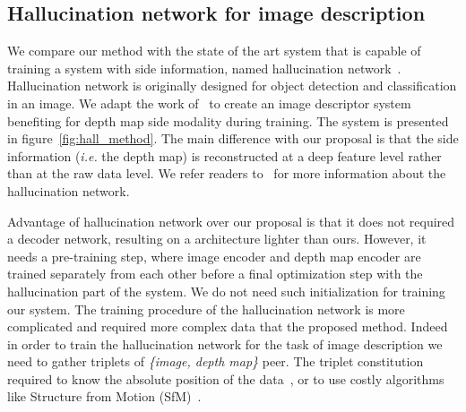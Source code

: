 %

%

\subsection{Hallucination network for image description}
\label{subsec:hall}
We compare our method with the state of the art system that is capable of training a system with side information, named hallucination network~\cite{Hoffman2016}. Hallucination network is originally designed for object detection and classification in an image. We adapt the work of~\cite{Hoffman2016} to create an image descriptor system benefiting for depth map side modality during training. The system is presented in figure~\ref{fig:hall_method}. The main difference with our proposal is that the side information (\textit{i.e.} the depth map) is reconstructed at a deep feature level rather than at the raw data level. We refer readers to~\cite{Hoffman2016} for more information about the hallucination network.

Advantage of hallucination network over our proposal is that it does not required a decoder network, resulting on a architecture lighter than ours. However, it needs a pre-training step, where image encoder and depth map encoder are trained separately from each other before a final optimization step with the hallucination part of the system. We do not need such initialization for training our system. The training procedure of the hallucination network is more complicated and required more complex data that the proposed method. Indeed in order to train the hallucination network for the task of image description we need to gather triplets of \textit{\{image, depth map\}} peer. The triplet constitution required to know the absolute position of the data~\cite{Arandjelovic2017,Liu2018}, or to use costly algorithms like Structure from Motion (SfM)~\cite{Godard2017,Radenovic2017,Kim2017a}. 

